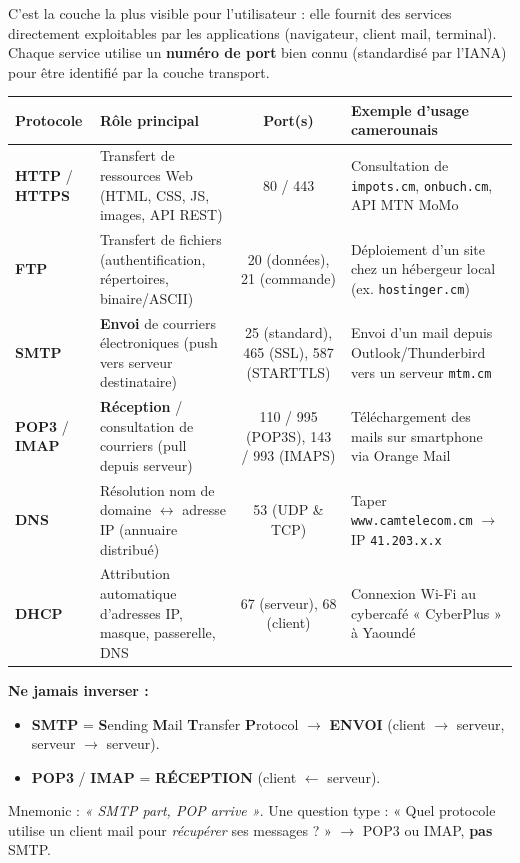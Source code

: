 \documentclass[11pt]{article}
\begin{document}
C'est la couche la plus visible pour l'utilisateur : elle fournit des services directement exploitables par les applications (navigateur, client mail, terminal). Chaque service utilise un \textbf{numéro de port} bien connu (standardisé par l'IANA) pour être identifié par la couche transport.

\begin{center}
\begin{tabularx}{\linewidth}{|l|X|c|X|}
\hline
\rowcolor{popblueL}
\textbf{Protocole} & \textbf{Rôle principal} & \textbf{Port(s)} & \textbf{Exemple d'usage camerounais} \\
\hline
\textbf{HTTP} / \textbf{HTTPS} & Transfert de ressources Web (HTML, CSS, JS, images, API REST) & 80 / 443 & Consultation de \texttt{impots.cm}, \texttt{onbuch.cm}, API MTN MoMo \\
\hline
\textbf{FTP} & Transfert de fichiers (authentification, répertoires, binaire/ASCII) & 20 (données), 21 (commande) & Déploiement d'un site chez un hébergeur local (ex. \texttt{hostinger.cm}) \\
\hline
\textbf{SMTP} & \textbf{Envoi} de courriers électroniques (push vers serveur destinataire) & 25 (standard), 465 (SSL), 587 (STARTTLS) & Envoi d'un mail depuis Outlook/Thunderbird vers un serveur \texttt{mtm.cm} \\
\hline
\textbf{POP3} / \textbf{IMAP} & \textbf{Réception} / consultation de courriers (pull depuis serveur) & 110 / 995 (POP3S), 143 / 993 (IMAPS) & Téléchargement des mails sur smartphone via Orange Mail \\
\hline
\textbf{DNS} & Résolution nom de domaine $\leftrightarrow$ adresse IP (annuaire distribué) & 53 (UDP \& TCP) & Taper \texttt{www.camtelecom.cm} $\to$ IP \texttt{41.203.x.x} \\
\hline
\textbf{DHCP} & Attribution automatique d'adresses IP, masque, passerelle, DNS & 67 (serveur), 68 (client) & Connexion Wi-Fi au cybercafé « CyberPlus » à Yaoundé \\
\hline
\end{tabularx}
\end{center}

\begin{attention}
\textbf{Ne jamais inverser :}
\begin{itemize}
    \item \textbf{SMTP} = \textbf{S}ending \textbf{M}ail \textbf{T}ransfer \textbf{P}rotocol $\to$ \textbf{ENVOI} (client $\to$ serveur, serveur $\to$ serveur).
    \item \textbf{POP3} / \textbf{IMAP} = \textbf{RÉCEPTION} (client $\leftarrow$ serveur).
\end{itemize}
Mnemonic : \emph{« SMTP part, POP arrive »}. Une question type : « Quel protocole utilise un client mail pour \emph{récupérer} ses messages ? » $\to$ POP3 ou IMAP, \textbf{pas} SMTP.
\end{attention}
\end{document}
